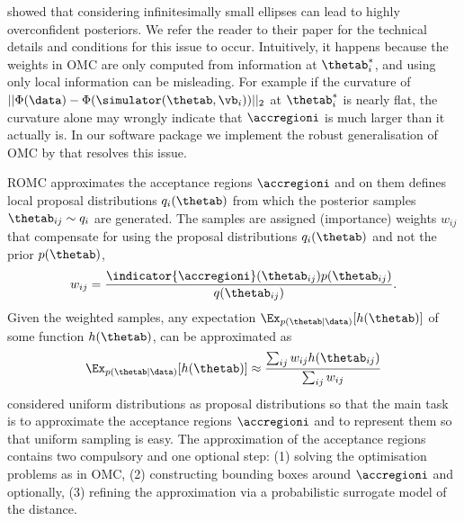\citet{Ikonomov2019} showed that considering infinitesimally small
ellipses can lead to highly overconfident posteriors. We refer the
reader to their paper for the technical details and conditions for
this issue to occur. Intuitively, it happens because the weights in
OMC are only computed from information at $\thetab_i^*$, and using
only local information can be misleading. For example if the curvature
of $||\Phi(\data)-\Phi(\simulator(\thetab, \vb_i))||_2$ at
$\thetab_i^*$ is nearly flat, the curvature alone may wrongly indicate
that $\accregioni$ is much larger than it actually is. In
our software package we implement the robust generalisation of OMC by
\citet{Ikonomov2019} that resolves this issue.

ROMC approximates the acceptance regions $\accregioni$ and on them defines
local proposal distributions $q_i(\thetab)$ from which the
posterior samples $\thetab_{ij} \sim q_i$ are generated. The samples
are assigned (importance) weights $w_{ij}$ that compensate for using
the proposal distributions $q_i(\thetab)$ and not the prior
$p(\thetab)$,
\begin{equation}
  w_{ij} = \frac{\indicator{\accregioni}(\thetab_{ij}) p(\thetab_{ij})}{q(\thetab_{ij})}.
  \label{eq:sampling}
\end{equation}
Given the weighted samples, any expectation
$\Ex_{p(\thetab|\data)}[h(\thetab)]$ of some function $h(\thetab)$, can be approximated as
\begin{equation} \label{eq:expectation}
  \Ex_{p(\thetab|\data)}[h(\thetab)] \approx \frac{\sum_{ij} w_{ij} h(\thetab_{ij})}{\sum_{ij} w_{ij}}
\end{equation}
\citet{Ikonomov2019} considered uniform distributions as proposal
distributions so that the main task is to approximate the acceptance
regions $\accregioni$ and to represent them so that uniform sampling
is easy. The approximation of the acceptance regions contains two
compulsory and one optional step: (1) solving the optimisation
problems as in OMC, (2) constructing bounding boxes around
$\accregioni$ and optionally, (3) refining the approximation via a
probabilistic surrogate model of the distance.
